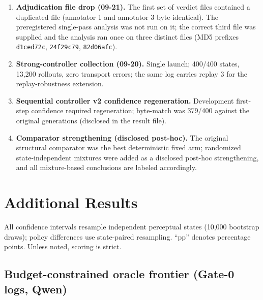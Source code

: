 \documentclass[10pt]{article}
\begin{document}
\begin{enumerate}
  train-split draw and the extraction script was pointed at the val
  manifest (fixed); the second and third attempts lost the shared GPU to
  other users' jobs during the 1.5-hour training step and at server
  start. The frozen artifact (\texttt{ed93f19437264e56}, 09-20 15:59) was
  never retrained, no evaluation state was collected before the final
  launch (09-21 09:56), and the fresh-set hidden states were extracted
  after collection from STOP-time inputs only. The training pool
  intentionally includes every previously analyzed TextVQA set (1,750
  states); the evaluation set is disjoint from all of them.
\item \textbf{Adjudication file drop (09-21).} The first set of verdict files
  contained a duplicated file (annotator 1 and annotator 3 byte-identical).
  The preregistered single-pass analysis was not run on it; the correct
  third file was supplied and the analysis ran once on three distinct files
  (MD5 prefixes \texttt{d1ced72c}, \texttt{24f29c79}, \texttt{82d06afc}).
\item \textbf{Strong-controller collection (09-20).} Single launch; 400/400
  states, 13,200 rollouts, zero transport errors; the same log carries
  replay 3 for the replay-robustness extension.
\item \textbf{Sequential controller v2 confidence regeneration.}
  Development first-step confidence required regeneration; byte-match was
  379/400 against the original generations (disclosed in the result file).
\item \textbf{Comparator strengthening (disclosed post-hoc).} The original
  structural comparator was the best deterministic fixed arm; randomized
  state-independent mixtures were added as a disclosed post-hoc
  strengthening, and all mixture-based conclusions are labeled accordingly.
\end{enumerate}

\section{Additional Results}
\label{sec:results}

All confidence intervals resample independent perceptual states
(10{,}000 bootstrap draws); policy differences use state-paired resampling.
``pp'' denotes percentage points. Unless noted, scoring is strict.

\subsection{Budget-constrained oracle frontier (Gate-0 logs, Qwen)}
\end{document}

